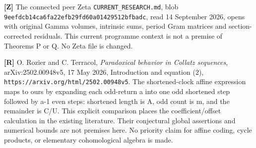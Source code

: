 \textbf{{[}Z{]}} The connected peer Zeta
\nolinkurl{CURRENT_RESEARCH.md}, blob
\nolinkurl{9eefdcb14ca6fa22efb29fd60a01429512bfbadc}, read 14 September
2026, opens with original Gamma volumes, intrinsic sums, period Gram
matrices and section-corrected residuals. This current programme context
is not a premise of Theorems P or Q. No Zeta file is changed.

\textbf{{[}R{]}} O. Rozier and C. Terracol, \emph{Paradoxical behavior
in Collatz sequences}, arXiv:2502.00948v5, 17 May 2026, Introduction and
equation (2), \nolinkurl{https://arxiv.org/html/2502.00948v5}. The
shortened-clock affine expression maps to ours by expanding each
odd-return a into one odd shortened step followed by a-1 even steps:
shortened length is A, odd count is m, and the remainder is C/U. This
explicit comparison places the coefficient/offset calculation in the
existing literature. Their conjectural global assertions and numerical
bounds are not premises here. No priority claim for affine coding, cycle
products, or elementary cohomological algebra is made.

